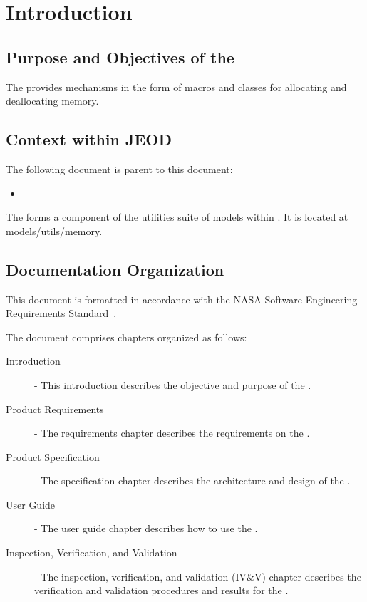 %
% 
\chapter{Introduction}
\label{ch:intro}

\section{Purpose and Objectives of the \ModelDesc}
\label{sec:purp}
The \ModelDesc provides mechanisms in the form of macros and classes
for allocating and deallocating memory.

\section{Context within JEOD}
The following document is parent to this document:
\begin{itemize}
\item \hyperJEOD
\end{itemize}

The \ModelDesc forms a component of the utilities suite of
models within \JEODid. It is located at
models/utils/memory.





\section{Documentation Organization}
\label{sec:docorg}
This document is formatted in accordance with the 
NASA Software Engineering Requirements Standard~\cite{NASA:SWE}.

The document comprises chapters organized as follows:

\begin{description}
\item[Introduction] - 
This introduction describes the objective and purpose of the \ModelDesc.

\item[Product Requirements] -
The requirements chapter describes the requirements on the \ModelDesc.

\item[Product Specification] -
The specification chapter describes
the architecture and design of the \ModelDesc.

\item[User Guide] -
The user guide chapter describes
how to use the \ModelDesc.
 
\item[Inspection, Verification, and Validation] -
The inspection, verification, and validation (IV\&V) chapter describes
the verification and validation procedures and results for the \ModelDesc.
\end{description}
